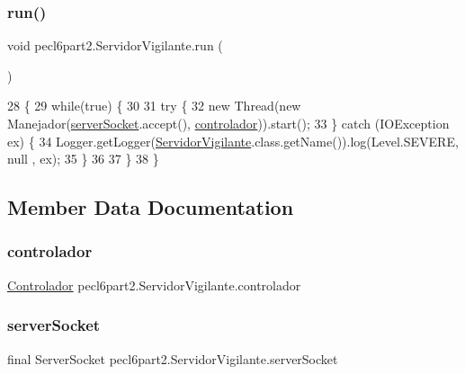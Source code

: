 \subsubsection{\texorpdfstring{run()}{run()}}
{\footnotesize\ttfamily void pecl6part2.\+Servidor\+Vigilante.\+run (\begin{DoxyParamCaption}{ }\end{DoxyParamCaption})\hspace{0.3cm}{\ttfamily [inline]}}


\begin{DoxyCode}
28                       \{
29         \textcolor{keywordflow}{while}(\textcolor{keyword}{true}) \{
30                        
31             \textcolor{keywordflow}{try} \{
32                 \textcolor{keyword}{new} Thread(\textcolor{keyword}{new} Manejador(\mbox{\hyperlink{classpecl6part2_1_1_servidor_vigilante_aaa40cd2b5cc8c603c6dce1d8a440aca6}{serverSocket}}.accept(), 
      \mbox{\hyperlink{classpecl6part2_1_1_servidor_vigilante_a74b80f98c6625e80f95d1d1bfd0c49cc}{controlador}})).start();
33             \} \textcolor{keywordflow}{catch} (IOException ex) \{
34                 Logger.getLogger(\mbox{\hyperlink{classpecl6part2_1_1_servidor_vigilante_aec607bf37f7f8fe1c8ff1e6c36d5c3ca}{ServidorVigilante}}.class.getName()).log(Level.SEVERE, null
      , ex);
35             \}
36         
37         \}
38     \}
\end{DoxyCode}


\subsection{Member Data Documentation}
\mbox{\label{classpecl6part2_1_1_servidor_vigilante_a74b80f98c6625e80f95d1d1bfd0c49cc}} 
\subsubsection{\texorpdfstring{controlador}{controlador}}
{\footnotesize\ttfamily \mbox{\hyperlink{classpecl6part2_1_1_controlador}{Controlador}} pecl6part2.\+Servidor\+Vigilante.\+controlador\hspace{0.3cm}{\ttfamily [private]}}

\mbox{\label{classpecl6part2_1_1_servidor_vigilante_aaa40cd2b5cc8c603c6dce1d8a440aca6}} 
\subsubsection{\texorpdfstring{server\+Socket}{serverSocket}}
{\footnotesize\ttfamily final Server\+Socket pecl6part2.\+Servidor\+Vigilante.\+server\+Socket\hspace{0.3cm}{\ttfamily [private]}}

